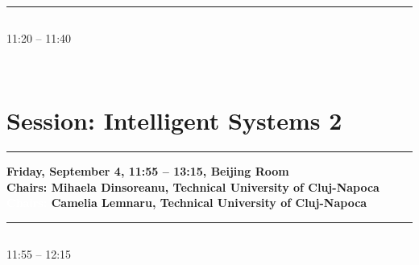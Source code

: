             
            \\ 
            \noindent\rule{\textwidth}{0.4pt}
\vspace*{-36pt}\subsection[ 
    	   {\bf Pre-Processing Flow for Enhancing Learning from Medical Data
           } \\
           {\it Sebastian Muresan, Ioana Faloba, Camelia Lemnaru, Rodica Potolea
           }
	]
	    {
            }
	    11:20 -- 11:40\nopagebreak

            
            \\ 


\section{{\bf \large Session: 
Intelligent Systems 2
}} \vspace{-15pt}

\noindent\rule{\textwidth}{0.4pt} \nopagebreak
{\bf  
Friday, September 4, 11:55 -- 13:15, Beijing Room
} \\ \nopagebreak
{\bf  Chairs: 
Mihaela Dinsoreanu, Technical University of Cluj-Napoca
} \\ \nopagebreak
{\bf  \textcolor{white}{Chairs:} 
Camelia Lemnaru, Technical University of Cluj-Napoca
} \\ \nopagebreak
\noindent\rule{\textwidth}{0.4pt}\nopagebreak


\vspace*{-36pt}\subsection[ 
    	   {\bf A learning-based Approach for Romanian Syllabification and Stress Assignment
           } \\
           {\it Diana Balc, Anamaria Beleiu, Rodica Potolea, Camelia Lemnaru
           }
	]
	    {
            }
	    11:55 -- 12:15 \nopagebreak

